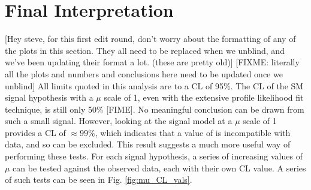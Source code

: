 \FloatBarrier
\section{Final Interpretation}

    [Hey steve, for this first edit round, don't worry about the formatting of any of the plots in this section.
    They all need to be replaced when we unblind, and we've been updating their format a lot. (these are pretty old)]
    [FIXME: literally all the plots and numbers and conclusions here need to be updated once we unblind]
    All limits quoted in this analysis are to a CL of 95\%.
    The CL of the SM signal hypothesis with a $\mu$ scale of 1,
        even with the extensive profile likelihood fit technique, is still only 50\% [FIME].
    No meaningful conclusion can be drawn from such a small signal.
    However, looking at the  signal model at a $\mu$ scale of 1 provides a CL of $\approx 99\%$,
        which indicates that a value of  is incompatible with data, and so can be excluded.
    This result suggests a much more useful way of performing these tests.
    For each signal hypothesis, a series of increasing values of $\mu$ can be tested against the observed data,
        each with their own CL value.
    A series of such tests can be seen in Fig. \ref{fig:mu_CL_vals}.

